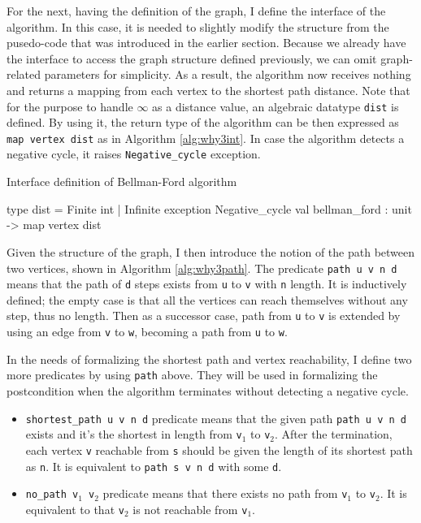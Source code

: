 \documentclass[a4paper,12pt]{article}
\begin{document}
For the next, having the definition of the graph, I define the
interface of the algorithm. In this case, it is needed to slightly
modify the structure from the pusedo-code that was introduced in the
earlier section. Because we already have the interface to access the
graph structure defined previously, we can omit graph-related
parameters for simplicity. As a result, the algorithm now receives
nothing and returns a mapping from each vertex to the shortest path
distance. Note that for the purpose to handle $\infty$ as a distance
value, an algebraic datatype \texttt{dist} is defined. By using it,
the return type of the algorithm can be then expressed as \texttt{map
  vertex dist} as in Algorithm \ref{alg:why3int}. In case the
algorithm detects a negative cycle, it raises \texttt{Negative\_cycle}
exception.

\begin{algorithm}
\caption{Interface definition of Bellman-Ford algorithm}\label{alg:why3int}
\begin{why3}
type dist = Finite int | Infinite
exception Negative_cycle
val bellman_ford : unit -> map vertex dist
\end{why3}
\end{algorithm}

Given the structure of the graph, I then introduce the notion of the
path between two vertices, shown in Algorithm \ref{alg:why3path}. The
predicate \texttt{path u v n d} means that the path of \texttt{d}
steps exists from \texttt{u} to \texttt{v} with \texttt{n} length. It
is inductively defined; the empty case is that all the vertices can
reach themselves without any step, thus no length. Then as a successor
case, path from \texttt{u} to \texttt{v} is extended by using an edge
from \texttt{v} to \texttt{w}, becoming a path from \texttt{u} to
\texttt{w}.

In the needs of formalizing the shortest path and vertex reachability,
I define two more predicates by using \texttt{path} above. They will
be used in formalizing the postcondition when the algorithm terminates
without detecting a negative cycle.

\begin{itemize}

\item \texttt{shortest\_path u v n d} predicate means that the given
  path \texttt{path u v n d} exists and it's the shortest in length
  from \texttt{v$_1$} to \texttt{v$_2$}. After the termination, each
  vertex \texttt{v} reachable from \texttt{s} should be given the
  length of its shortest path as \texttt{n}. It is equivalent to
  \texttt{path s v n d} with some \texttt{d}.

\item \texttt{no\_path v$_1$ v$_2$} predicate means that there exists
  no path from \texttt{v$_1$} to \texttt{v$_2$}. It is equivalent to
  that \texttt{v$_2$} is not reachable from \texttt{v$_1$}.

\end{itemize}
\end{document}
